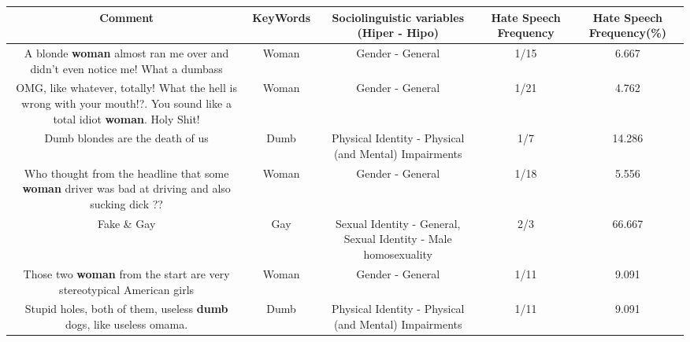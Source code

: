 \documentclass[11pt]{article}
\newlength\mylength
\begin{document}
\begin{center}
\setlength\mylength{\dimexpr\textwidth - 1\arrayrulewidth - 50\tabcolsep}
\begin{longtable}{|C{.65\mylength}|C{.30\mylength}|C{.12\mylength}|C{.12\mylength}|C{.12\mylength}|}
\hline
\textbf{Comment} & \textbf{KeyWords} & \textbf{Sociolinguistic variables (Hiper - Hipo)}  & \textbf{Hate Speech Frequency} & \textbf{Hate Speech Frequency(\%)} \\
\hline{}\small A blonde \textbf{woman} almost ran me over and didn't even notice me! What a dumbass\normalsize   & Woman & Gender - General & 1/15 & 6.667 \\  \hline
  \small OMG, like whatever, totally! What the hell is wrong with your mouth!?. You sound like a total idiot \textbf{woman}. Holy Shit!\normalsize   & Woman & Gender - General & 1/21 & 4.762 \\  \hline
  \small Dumb blondes are the death of us\normalsize   & Dumb & Physical Identity - Physical (and Mental) Impairments & 1/7 & 14.286 \\  \hline
  \small Who thought from the headline that some \textbf{woman} driver was bad at driving and also sucking dick ??\normalsize   & Woman & Gender - General & 1/18 & 5.556 \\  \hline
  \small Fake \& Gay\normalsize   & Gay & Sexual Identity - General, Sexual Identity - Male homosexuality & 2/3 & 66.667 \\  \hline
  \small Those two \textbf{woman} from the start are very stereotypical American girls\normalsize   & Woman & Gender - General & 1/11 & 9.091 \\  \hline
  \small Stupid holes, both of them,  useless \textbf{dumb} dogs, like useless omama.\normalsize   & Dumb & Physical Identity - Physical (and Mental) Impairments & 1/11 & 9.091 \\  \hline

\end{longtable}
\end{center}
\end{document}
